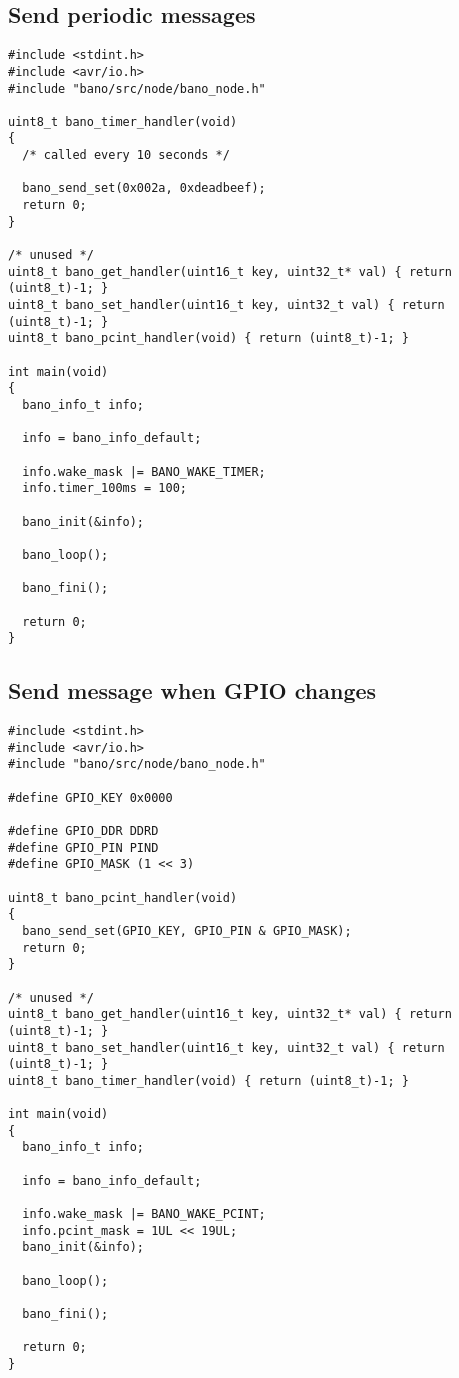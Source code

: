 \documentclass[a4paper, 11pt]{article}
\begin{document}
\subsection{Send periodic messages}
\begin{tiny}
\begin{verbatim}
#include <stdint.h>
#include <avr/io.h>
#include "bano/src/node/bano_node.h"

uint8_t bano_timer_handler(void)
{
  /* called every 10 seconds */

  bano_send_set(0x002a, 0xdeadbeef);
  return 0;
}

/* unused */
uint8_t bano_get_handler(uint16_t key, uint32_t* val) { return (uint8_t)-1; }
uint8_t bano_set_handler(uint16_t key, uint32_t val) { return (uint8_t)-1; }
uint8_t bano_pcint_handler(void) { return (uint8_t)-1; }

int main(void)
{
  bano_info_t info;

  info = bano_info_default;

  info.wake_mask |= BANO_WAKE_TIMER;
  info.timer_100ms = 100;

  bano_init(&info);

  bano_loop();

  bano_fini();

  return 0;
}
\end{verbatim}
\end{tiny}


\clearpage
\subsection{Send message when GPIO changes}
\begin{tiny}
\begin{verbatim}
#include <stdint.h>
#include <avr/io.h>
#include "bano/src/node/bano_node.h"

#define GPIO_KEY 0x0000

#define GPIO_DDR DDRD
#define GPIO_PIN PIND
#define GPIO_MASK (1 << 3)

uint8_t bano_pcint_handler(void)
{
  bano_send_set(GPIO_KEY, GPIO_PIN & GPIO_MASK);
  return 0;
}

/* unused */
uint8_t bano_get_handler(uint16_t key, uint32_t* val) { return (uint8_t)-1; }
uint8_t bano_set_handler(uint16_t key, uint32_t val) { return (uint8_t)-1; }
uint8_t bano_timer_handler(void) { return (uint8_t)-1; }

int main(void)
{
  bano_info_t info;

  info = bano_info_default;

  info.wake_mask |= BANO_WAKE_PCINT;
  info.pcint_mask = 1UL << 19UL;
  bano_init(&info);

  bano_loop();

  bano_fini();

  return 0;
}
\end{verbatim}
\end{tiny}
\end{document}
